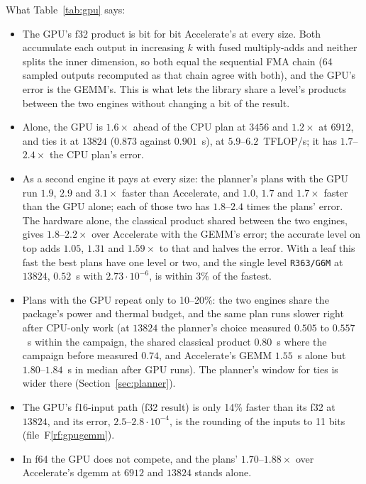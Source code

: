 \documentclass[11pt]{article}
\newcommand{\rf}[1]{F\ref{rf:#1}}
\newcommand{\lv}[1]{\texttt{#1}}
\begin{document}
What Table~\ref{tab:gpu} says:
\begin{itemize}
\item The GPU's f32 product is bit for bit Accelerate's at every size.  Both
  accumulate each output in increasing $k$ with fused multiply-adds and
  neither splits the inner dimension, so both equal the sequential FMA chain
  (64 sampled outputs recomputed as that chain agree with both), and the
  GPU's error is the GEMM's.  This is what lets the library share a level's
  products between the two engines without changing a bit of the result.
\item Alone, the GPU is $1.6\times$ ahead of the CPU plan at $3456$ and
  $1.2\times$ at $6912$, and ties it at $13824$ ($0.873$ against $0.901$~s),
  at $5.9$--$6.2$~TFLOP/s; it has $1.7$--$2.4\times$ the
  CPU plan's error.
\item As a second engine it pays at every size: the planner's plans with the
  GPU run $1.9$, $2.9$ and $3.1\times$ faster than Accelerate, and $1.0$,
  $1.7$ and $1.7\times$ faster than the GPU alone; each of those two has $1.8$--$2.4$ times the plans' error.  The hardware alone, the classical product shared
  between the two engines, gives $1.8$--$2.2\times$ over Accelerate with the
  GEMM's error; the accurate level on top adds $1.05$, $1.31$ and $1.59\times$
  to that and halves the error.  With a leaf this fast the best plans have
  one level or two, and the single level \lv{R363/G6M} at $13824$, $0.52$~s
  with $2.73\cdot10^{-6}$, is within 3\% of the fastest.
\item Plans with the GPU repeat only to 10--20\%: the two engines share the
  package's power and thermal budget, and the same plan runs slower right
  after CPU-only work (at $13824$ the planner's choice measured $0.505$ to
  $0.557$~s within the campaign, the shared classical product $0.80$~s where the campaign before measured $0.74$, and Accelerate's GEMM $1.55$~s alone but
  $1.80$--$1.84$~s in median after GPU runs).  The planner's window for ties is wider there
  (Section~\ref{sec:planner}).
\item The GPU's f16-input path (f32 result) is only 14\% faster than its f32
  at $13824$, and its error, $2.5$--$2.8\cdot10^{-4}$, is the rounding of the
  inputs to 11 bits (file~\rf{gpugemm}).
\item In f64 the GPU does not compete, and the plans' $1.70$--$1.88\times$
  over Accelerate's dgemm at $6912$ and $13824$ stands alone.
\end{itemize}
\end{document}
